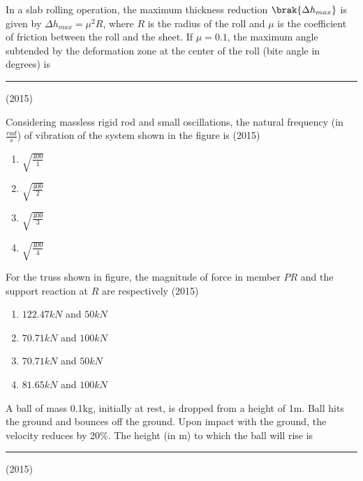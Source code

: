     
    \item In a slab rolling operation, the maximum thickness reduction $\brak{\Delta h_{max}}$ is given by $\Delta h_{max}=\mu^2R$, where $R$ is the radius of the roll and $\mu$ is the coefficient of friction between the roll and the sheet. If $\mu=0.1$, the maximum angle subtended by the deformation zone at the center of the roll (bite angle in degrees) is \rule{1cm}{0.15mm}
    \hfill{(2015)}

        
    \item Considering massless rigid rod and small oscillations, the natural frequency (in $\frac{rad}{s}$) of vibration of the system shown in the figure is
    \hfill{(2015)}

    

    \begin{multicols}{4}
        \begin{enumerate}
            \item $\sqrt{\frac{400}{1}}$
            \item $\sqrt{\frac{400}{2}}$
            \item $\sqrt{\frac{400}{3}}$
            \item $\sqrt{\frac{400}{4}}$
        \end{enumerate}
    \end{multicols}

    
    \item For the truss shown in figure, the magnitude of force in member $PR$ and the support reaction at $R$ are respectively
    \hfill{(2015)}
    
    


    \begin{multicols}{2}
        \begin{enumerate}
            \item $122.47kN$ and $50kN$
            \item $70.71kN$ and $100kN$
            \item $70.71kN$ and $50kN$
            \item $81.65kN$ and $100kN$
        \end{enumerate}
    \end{multicols}

    
    \item A ball of mass 0.1kg, initially at rest, is dropped from a height of 1m. Ball hits the ground and bounces off the ground. Upon impact with the ground, the velocity reduces by 20\%. The height (in m) to which the ball will rise is \rule{1cm}{0.15mm}
    \hfill{(2015)}

